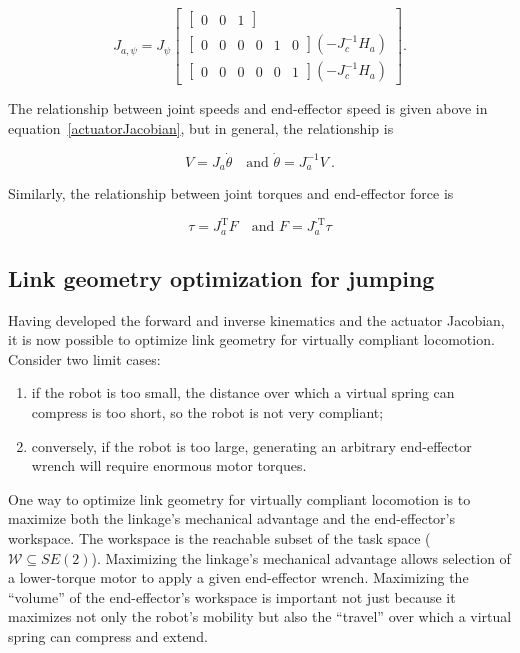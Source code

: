 \documentclass{report}
\begin{document}
\begin{equation}
J_{a,\psi} = J_{\psi}\begin{bmatrix}
\begin{bmatrix}0 & 0 & 1 \end{bmatrix}\\
\begin{bmatrix}
0 & 0 & 0 & 0 & 1 & 0
\end{bmatrix}\left(-J_{c}^{-1}H_{a}\right)\\
\begin{bmatrix}
0 & 0 & 0 & 0 & 0 & 1
\end{bmatrix}\left(-J_{c}^{-1}H_{a}\right)
\end{bmatrix}\text{.}
\end{equation}

The relationship between joint speeds and end-effector speed is given above in equation~\ref{actuatorJacobian}, but in general, the relationship is

\begin{equation}
V = J_{a}\dot{\theta}\quad \text{and }\dot{\theta} = J_{a}^{-1}V\ \text{.}
\end{equation}

Similarly, the relationship between joint torques and end-effector force is

\begin{equation}
\tau = J_{a}^{\text{T}}F\quad \text{and }F = J_{a}^{\text{-T}}\tau
\end{equation}

\subsection[Link geometry optimization for jumping]{Link geometry optimization for jumping}

Having developed the forward and inverse kinematics and the actuator Jacobian, it is now possible to optimize link geometry for virtually compliant locomotion. Consider two limit cases:
\begin{enumerate}
\item if the robot is too small, the distance over which a virtual spring can compress is too short, so the robot is not very compliant;
\item conversely, if the robot is too large, generating an arbitrary end-effector wrench will require enormous motor torques.
\end{enumerate}

One way to optimize link geometry for virtually compliant locomotion is to maximize both the linkage's mechanical advantage and the end-effector's workspace.  The workspace is the reachable subset of the task space ($\mathcal{W} \subseteq SE(2)$). Maximizing the linkage's mechanical advantage allows selection of a lower-torque motor to apply a given end-effector wrench. Maximizing the ``volume'' of the end-effector's workspace is important not just because it maximizes not only the robot's mobility but also the ``travel'' over which a virtual spring can compress and extend.
\end{document}
